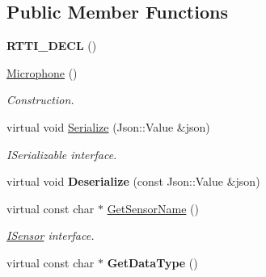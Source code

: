\subsection*{Public Member Functions}
\begin{DoxyCompactItemize}
\item 
\mbox{\label{class_microphone_a19b9b7d9d4d92fb532be7e5b19c39ea1}} 
{\bfseries R\+T\+T\+I\+\_\+\+D\+E\+CL} ()
\item 
\mbox{\label{class_microphone_a1c6930eb9e11886e30b695d6a2e94b5e}} 
\hyperlink{class_microphone_a1c6930eb9e11886e30b695d6a2e94b5e}{Microphone} ()
\begin{DoxyCompactList}\small\item\em Construction. \end{DoxyCompactList}\item 
\mbox{\label{class_microphone_a29294b7f7ac52f388086d97eca9d2b16}} 
virtual void \hyperlink{class_microphone_a29294b7f7ac52f388086d97eca9d2b16}{Serialize} (Json\+::\+Value \&json)
\begin{DoxyCompactList}\small\item\em I\+Serializable interface. \end{DoxyCompactList}\item 
\mbox{\label{class_microphone_aa927c37df60cdd615353cedd044c2380}} 
virtual void {\bfseries Deserialize} (const Json\+::\+Value \&json)
\item 
\mbox{\label{class_microphone_ae5e452c8edcd7221ed14085f1c5d9a4d}} 
virtual const char $\ast$ \hyperlink{class_microphone_ae5e452c8edcd7221ed14085f1c5d9a4d}{Get\+Sensor\+Name} ()
\begin{DoxyCompactList}\small\item\em \hyperlink{class_i_sensor}{I\+Sensor} interface. \end{DoxyCompactList}\item 
\mbox{\label{class_microphone_a706e505971eb256e19633d59033b293f}} 
virtual const char $\ast$ {\bfseries Get\+Data\+Type} ()
\item 
\mbox{\label{class_microphone_a1b313ccac38820c91eec1626853dd257}} 

\end{DoxyCompactItemize}
